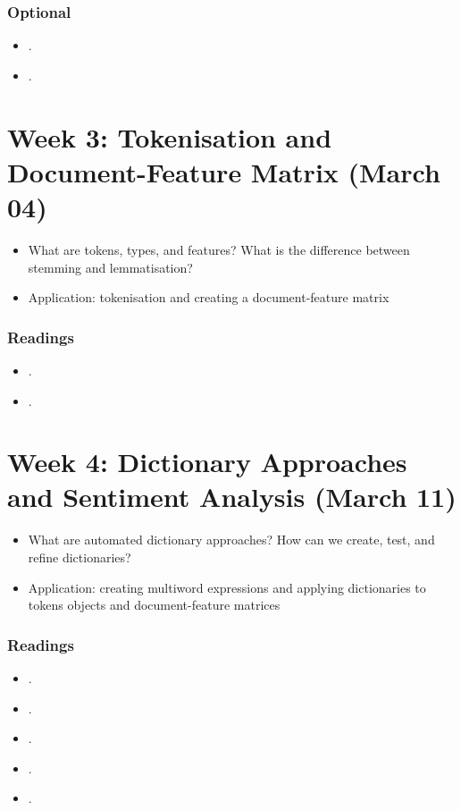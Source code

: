 \documentclass[abstract=on,parskip=full,headings=standardclasses,fontsize=11pt,paper=a4]{scrartcl}
\begin{document}
\subsubsection*{Optional}
\begin{itemize}
\item {}.
\item {}.
\end{itemize}

\section{Week 3:  Tokenisation and Document-Feature Matrix (March 04)}

\begin{itemize}
\item What are tokens, types, and features? What is the difference between stemming and lemmatisation?
\item Application: tokenisation and creating a document-feature matrix
\end{itemize}

\subsubsection*{Readings}
\begin{itemize}
 \item {}.
 \item {}.
\end{itemize}
 
  
\section{Week 4: Dictionary Approaches and Sentiment Analysis (March 11)}

\begin{itemize}
\item What are automated dictionary approaches? How can we create, test, and refine dictionaries?
\item Application: creating multiword expressions and applying dictionaries to tokens objects and document-feature matrices
\end{itemize}

\subsubsection*{Readings}
\begin{itemize}
\item {}.
\item {}.
\item {}.
\item {}.
\item {}.
\end{itemize}
\end{document}
